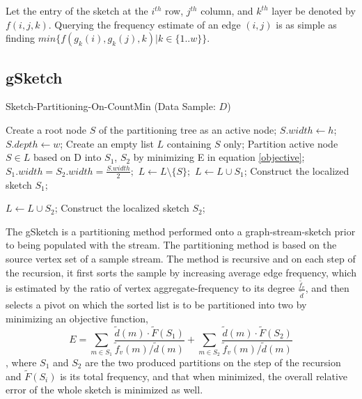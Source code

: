 Let the entry of the sketch at the $i^{th}$ row, $j^{th}$ column, and $k^{th}$ layer be denoted by $f(i,j,k)$. Querying the frequency estimate of an edge $(i,j)$ is as simple as finding $min\{f(g_k(i),g_k(j),k)|k \in \{1..w\}\}$.

\subsection{gSketch}
\begin{algorithm}
\caption{Sketch-Partitioning-On-CountMin (Data Sample: $D$)}\label{cm}
\begin{algorithmic}[1]

\State Create a root node $S$ of the partitioning tree as an
active node;
\State $S.width \gets h$;
\State $S.depth \gets w$;
\State Create an empty list $L$ containing $S$ only;
\State Partition active node $S \in L$ based on D into $S_1$, $S_2$ by minimizing E in equation \ref{objective};
\State $S_1.width = S_2.width = \frac{S.width}{2};$
\State $L \gets L \setminus \{ S \};$
\State $L \gets L \cup S_1$;
\Else
\State Construct the localized sketch $S_1$;
\EndIf

\State $L \gets L \cup S_2$;
\Else
\State Construct the localized sketch $S_2$;
\EndIf

\EndWhile

\end{algorithmic}
\end{algorithm}
The gSketch\cite{DBLP} is a partitioning method performed onto a graph-stream-sketch prior to being populated with the stream. The partitioning method is based on the source vertex set of a sample stream. The method is recursive and on each step of the recursion, it first sorts the sample by increasing average edge frequency, which is estimated by the ratio of vertex aggregate-frequency to its degree $\frac{\tilde{f_v}}{\tilde{d}}$, and then selects a pivot on which the sorted list is to be partitioned into two by minimizing an objective function,
\begin{equation}
\label{objective}
E = \sum_{m \in S_1} \frac{\tilde{d}(m) \cdot \tilde{F}(S_1)}{\tilde{f}_v(m) / \tilde{d}(m)} + \sum_{m \in S_2} \frac{\tilde{d}(m) \cdot \tilde{F}(S_2)}{\tilde{f}_v(m) / \tilde{d}(m)}
\end{equation}, where $S_1$ and $S_2$ are the two produced partitions on the step of the recursion and $\tilde{F}(S_i)$ is its total frequency, and that when minimized, the overall relative error of the whole sketch is minimized as well.

